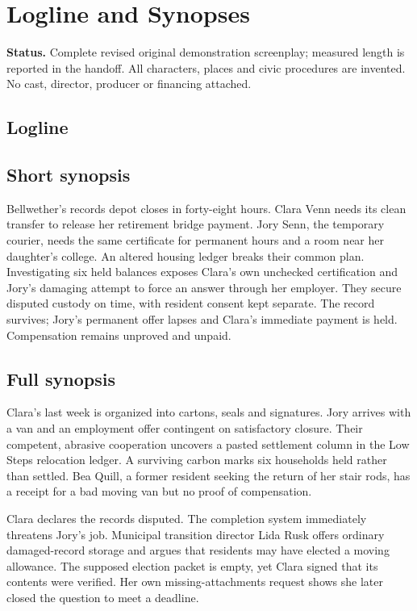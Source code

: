 \section{Logline and Synopses}
\textbf{Status.} Complete revised original demonstration screenplay; measured length is reported in the handoff. All characters, places and civic procedures are invented. No cast, director, producer or financing attached.

\subsection{Logline}
\filmlogline

\subsection{Short synopsis}
Bellwether's records depot closes in forty-eight hours. Clara Venn needs its clean transfer to release her retirement bridge payment. Jory Senn, the temporary courier, needs the same certificate for permanent hours and a room near her daughter's college. An altered housing ledger breaks their common plan. Investigating six held balances exposes Clara's own unchecked certification and Jory's damaging attempt to force an answer through her employer. They secure disputed custody on time, with resident consent kept separate. The record survives; Jory's permanent offer lapses and Clara's immediate payment is held. Compensation remains unproved and unpaid.

\subsection{Full synopsis}
Clara's last week is organized into cartons, seals and signatures. Jory arrives with a van and an employment offer contingent on satisfactory closure. Their competent, abrasive cooperation uncovers a pasted settlement column in the Low Steps relocation ledger. A surviving carbon marks six households held rather than settled. Bea Quill, a former resident seeking the return of her stair rods, has a receipt for a bad moving van but no proof of compensation.

Clara declares the records disputed. The completion system immediately threatens Jory's job. Municipal transition director Lida Rusk offers ordinary damaged-record storage and argues that residents may have elected a moving allowance. The supposed election packet is empty, yet Clara signed that its contents were verified. Her own missing-attachments request shows she later closed the question to meet a deadline.

